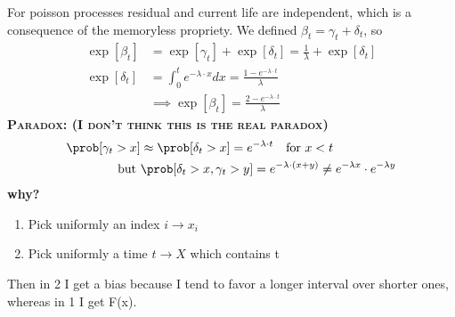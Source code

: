 For poisson processes residual and current life are independent, which is a consequence of the memoryless propriety. We defined $\beta_t=\gamma_t + \delta_t$, so
\begin{equation}\begin{split}
\exp[\beta_t]&=\exp[\gamma_t] + \exp[\delta_t]  = \frac{1}{\lambda} + \exp[\delta_t]\\
\exp[\delta_t]&= \int_0^t e^{-\lambda \cdot x} dx = \frac{1-e^{-\lambda \cdot t}}{\lambda} \\
&\implies \exp[\beta_t]= \frac{2-e^{-\lambda \cdot t}}{\lambda}
\end{split}\end{equation}
\textbf{\textsc{Paradox:   (I don't think this is the real paradox)}}
\begin{equation}
  \begin{split}
    \prob[\gamma_t > x] &\approx \prob[\delta_t>x] = e^{-\lambda \cdot t} \quad \text{for }x<t \\
    \text{but } &\prob[\delta_t >x , \gamma _ t > y ] = e^{-\lambda \cdot (x+y)} \neq e^{-\lambda x} \cdot e^{-\lambda y}
  \end{split}
\end{equation}
\textbf{why?}
\begin{enumerate}
  \item Pick uniformly an index $i \to x_i $
  \item Pick uniformly a time $t \to X$ which contains t
\end{enumerate}

Then in 2 I get a bias because I tend to favor a longer interval over shorter ones, whereas in 1 I get F(x).

